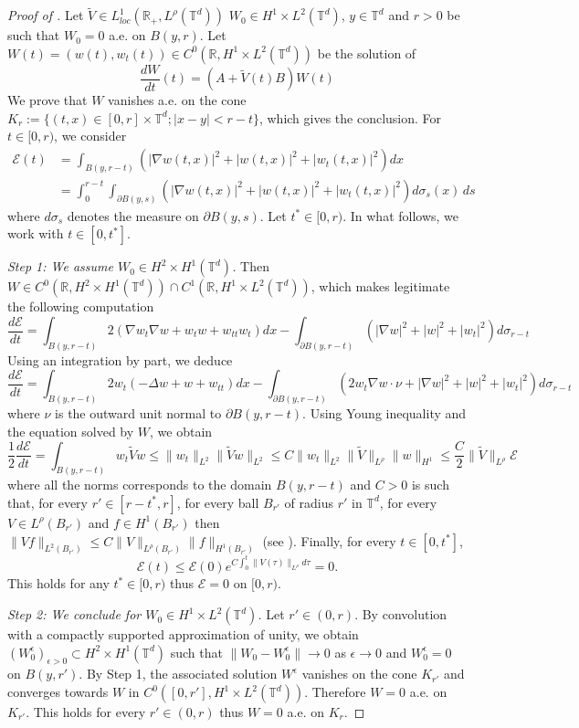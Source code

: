 \documentclass[a4paper]{article}
\theoremstyle{plain}
\newcommand{\T}{\mathbb{T}}
\newcommand{\R}{\mathbb{R}}
\begin{document}
\begin{proof}[Proof of ]
Let 
$\widetilde{V} \in L^1_{loc}(\R_+,L^{\rho}(\T^d))$
$W_0 \in H^1 \times L^2(\T^d)$, $y \in \T^d$ and $r>0$ be such that $W_0=0$ a.e. on $B(y,r)$. Let $W(t)=(w(t),w_t(t)) \in C^0(\R,H^1 \times L^2(\T^d))$ be the solution of $$\frac{dW}{dt}(t)=\left( A+ \widetilde{V}(t) B \right) W(t)$$
We prove that $W$ vanishes a.e. on the cone 
$K_r:=\{ (t,x) \in [0,r]\times \T^d ; |x-y|<r-t\}$, which gives the conclusion. For $t \in [0,r)$, we consider
$$\begin{aligned}
\mathcal{E}(t) & =\int_{B(y,r-t)} \left( |\nabla w(t,x)|^2 + |w(t,x)|^2 + |w_t(t,x)|^2 \right) dx 
\\ & = \int_0^{r-t} \int_{\partial B(y,s)} \left( 
|\nabla w(t,x)|^2 + |w(t,x)|^2 + |w_t(t,x)|^2
\right) d\sigma_s(x)\, ds
\end{aligned}$$
where $d\sigma_s$ denotes the measure on $\partial B(y,s)$.
Let $t^* \in [0,r)$. In what follows, we work with $t \in [0,t^*]$.

\noindent \emph{Step 1: We assume $W_0 \in H^2 \times H^1(\T^d)$.} Then $W \in C^0(\R,H^2 \times H^1(\T^d)) \cap C^1(\R,H^1 \times L^2(\T^d))$, which makes legitimate the following computation
$$\frac{d\mathcal{E}}{dt} =
\int_{B(y,r-t)} 2\left( \nabla w_t \nabla w + w_t w +  w_{tt} w_t \right) dx
- \int_{\partial B(y,r-t)} \left( 
|\nabla w|^2 + |w|^2 + |w_t|^2
\right) d\sigma_{r-t}$$
Using an integration by part, we deduce
$$\frac{d\mathcal{E}}{dt} 
=
\int_{B(y,r-t)} 2w_t \left( -\Delta w + w +  w_{tt} \right) dx
- \int_{\partial B(y,r-t)} \left( 2 w_t \nabla w \cdot \nu +
|\nabla w|^2 + |w|^2 + |w_t|^2
\right) d\sigma_{r-t}$$
where $\nu$ is the outward unit normal to $\partial B(y,r-t)$. Using Young inequality and the equation solved by $W$, we obtain
$$
\frac{1}{2} \frac{d\mathcal{E}}{dt} 
 =
\int_{B(y,r-t)} w_t \widetilde{V} w \leq 
\|w_t\|_{L^2} \| \widetilde{V} w \|_{L^{2}}
\leq 
C \|w_t\|_{L^2} \| \widetilde{V} \|_{L^{\rho}} \| w \|_{H^1}
\leq \frac{C}{2} \|\widetilde{V}\|_{L^{\rho}} \mathcal{E}
$$
where all the norms corresponds to the domain $B(y,r-t)$ and
$C>0$ is such that,
for every $r' \in [r-t^*,r]$, 
for every ball $B_{r'}$ of radius $r'$ in $\T^d$,
for every $V \in L^{\rho}(B_{r'})$ and $f \in H^1(B_{r'})$ then
$\| Vf \|_{L^2(B_{r'})} \leq C \|V\|_{L^{\rho}(B_{r'})} \|f\|_{H^1(B_{r'})}$ (see ).
Finally, for every $t \in [0,t^*]$, 
$$\mathcal{E}(t) \leq \mathcal{E}(0) 
e^{C \int_0^t \|V(\tau)\|_{L^{\rho}} d \tau} =0.$$
This holds for any $t^* \in [0,r)$ thus $\mathcal{E}=0$ on $[0,r)$.

\medskip
\noindent \emph{Step 2: We conclude for $W_0 \in H^1 \times L^2(\T^d)$.}  Let $r' \in (0,r)$. By convolution with a compactly supported approximation of unity, we obtain $(W_0^{\epsilon})_{\epsilon>0} \subset H^2 \times H^1(\T^d)$ such that $\|W_0-W_0^{\epsilon}\| \to 0$ as $\epsilon \to 0$ and $W_0^\epsilon=0$ on $B(y,r')$. By Step 1, the associated solution $W^{\epsilon}$ vanishes on the cone $K_{r'}$ and converges towards $W$ in $C^0([0,r'],H^1 \times L^2(\T^d))$. Therefore $W=0$ a.e. on $K_{r'}$. This holds for every $r' \in (0,r)$ thus $W=0$ a.e. on $K_{r}$.
\end{proof}
\end{document}
